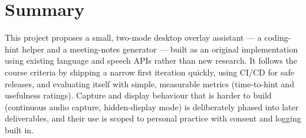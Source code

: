 \documentclass[11pt]{article}
\begin{document}
\section{Summary}
This project proposes a small, two-mode desktop overlay assistant --- a coding-hint helper
and a meeting-notes generator --- built as an original implementation using existing
language and speech APIs rather than new research. It follows the course criteria by
shipping a narrow first iteration quickly, using CI/CD for safe releases, and evaluating
itself with simple, measurable metrics (time-to-hint and usefulness ratings). Capture and
display behaviour that is harder to build (continuous audio capture, hidden-display mode) is
deliberately phased into later deliverables, and their use is scoped to personal practice
with consent and logging built in.
\end{document}

